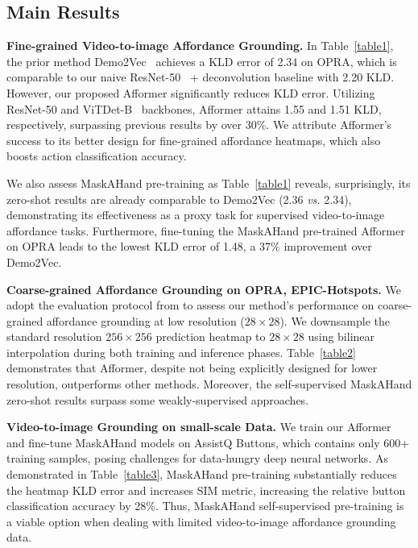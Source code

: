 \documentclass[10pt,twocolumn,letterpaper]{article}
\begin{document}
\subsection{Main Results}

\noindent\textbf{Fine-grained Video-to-image Affordance Grounding.} 
In Table~\ref{table1}, the prior method Demo2Vec~\cite{demo2vec} achieves a KLD error of 2.34 on OPRA, which is comparable to our naive ResNet-50~\cite{resnet} + deconvolution baseline with 2.20 KLD. However, our proposed Afformer significantly reduces KLD error. Utilizing ResNet-50 and ViTDet-B~\cite{vitdet} backbones, Afformer attains 1.55 and 1.51 KLD, respectively, surpassing previous results by over 30\%. We attribute Afformer's success to its better design for fine-grained affordance heatmaps, which also boosts action classification accuracy.

We also assess MaskAHand pre-training as Table~\ref{table1} reveals, surprisingly, its zero-shot results are already comparable to Demo2Vec (2.36 \textit{vs.} 2.34), demonstrating its effectiveness as a proxy task for supervised video-to-image affordance tasks. Furthermore, fine-tuning the MaskAHand pre-trained Afformer on OPRA leads to the lowest KLD error of 1.48, a 37\% improvement over Demo2Vec.

\noindent\textbf{Coarse-grained Affordance Grounding on OPRA, EPIC-Hotspots.} 
We adopt the evaluation protocol from \cite{hotspot} to assess our method's performance on coarse-grained affordance grounding at low resolution ($28 \times 28$). We downsample the standard resolution $256 \times 256$ prediction heatmap to $28 \times 28$ using bilinear interpolation during both training and inference phases. Table~\ref{table2} demonstrates that Afformer, despite not being explicitly designed for lower resolution, outperforms other methods. Moreover, the self-supervised MaskAHand zero-shot results surpass some weakly-supervised approaches.

\noindent\textbf{Video-to-image Grounding on small-scale Data.} 
We train our Afformer and fine-tune MaskAHand models on AssistQ Buttons, which contains only 600+ training samples, posing challenges for data-hungry deep neural networks. As demonstrated in Table~\ref{table3}, MaskAHand pre-training substantially reduces the heatmap KLD error and increases SIM metric, increasing the relative button classification accuracy by 28\%. Thus, MaskAHand self-supervised pre-training is a viable option when dealing with limited video-to-image affordance grounding data.
\end{document}
